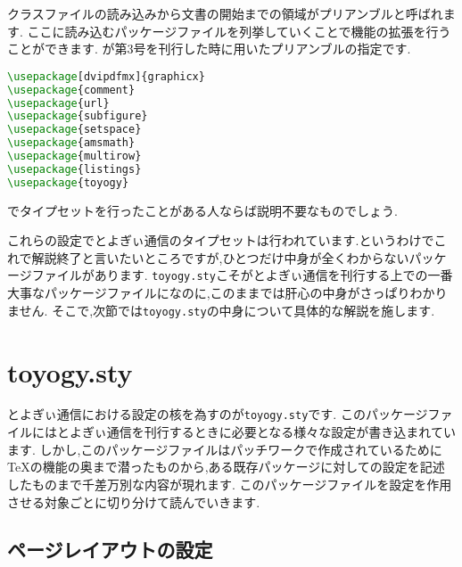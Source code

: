 クラスファイルの読み込みから文書の開始までの領域がプリアンブルと呼ばれます.
ここに読み込むパッケージファイルを列挙していくことで機能の拡張を行うことができます.
が第3号を刊行した時に用いたプリアンブルの指定です.
\begin{lstlisting}[caption=プリアンブル,label=lis:preamble,language=tex]
\usepackage[dvipdfmx]{graphicx}
\usepackage{comment}
\usepackage{url}
\usepackage{subfigure}
\usepackage{setspace}
\usepackage{amsmath}
\usepackage{multirow}
\usepackage{listings}
\usepackage{toyogy}
\end{lstlisting}
{\pLaTeX}でタイプセットを行ったことがある人ならば説明不要なものでしょう.

これらの設定でとよぎぃ通信のタイプセットは行われています.というわけでこれで解説終了と言いたいところですが,ひとつだけ中身が全くわからないパッケージファイルがあります.
\texttt{toyogy.sty}こそがとよぎぃ通信を刊行する上での一番大事なパッケージファイルになのに,このままでは肝心の中身がさっぱりわかりません.
そこで,次節では\texttt{toyogy.sty}の中身について具体的な解説を施します.
\section{toyogy.sty}

とよぎぃ通信における設定の核を為すのが\texttt{toyogy.sty}です.
このパッケージファイルにはとよぎぃ通信を刊行するときに必要となる様々な設定が書き込まれています.
しかし,このパッケージファイルはパッチワークで作成されているために{\TeX}の機能の奥まで潜ったものから,ある既存パッケージに対しての設定を記述したものまで千差万別な内容が現れます.
このパッケージファイルを設定を作用させる対象ごとに切り分けて読んでいきます.

\subsection{ページレイアウトの設定}

